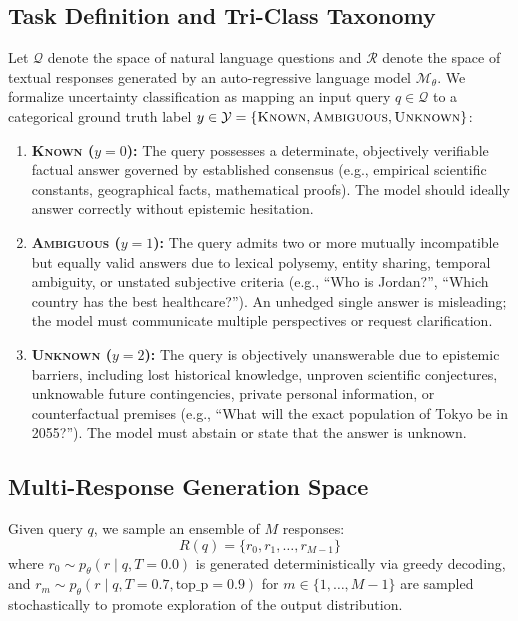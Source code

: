 \documentclass[conference]{IEEEtran}
\begin{document}
\subsection{Task Definition and Tri-Class Taxonomy}
Let $\mathcal{Q}$ denote the space of natural language questions and $\mathcal{R}$ denote the space of textual responses generated by an auto-regressive language model $\mathcal{M}_\theta$. We formalize uncertainty classification as mapping an input query $q \in \mathcal{Q}$ to a categorical ground truth label $y \in \mathcal{Y} = \{\textsc{Known}, \textsc{Ambiguous}, \textsc{Unknown}\}$:
\begin{enumerate}
    \item \textbf{\textsc{Known} ($y = 0$):} The query possesses a determinate, objectively verifiable factual answer governed by established consensus (e.g., empirical scientific constants, geographical facts, mathematical proofs). The model should ideally answer correctly without epistemic hesitation.
    \item \textbf{\textsc{Ambiguous} ($y = 1$):} The query admits two or more mutually incompatible but equally valid answers due to lexical polysemy, entity sharing, temporal ambiguity, or unstated subjective criteria (e.g., ``Who is Jordan?'', ``Which country has the best healthcare?''). An unhedged single answer is misleading; the model must communicate multiple perspectives or request clarification.
    \item \textbf{\textsc{Unknown} ($y = 2$):} The query is objectively unanswerable due to epistemic barriers, including lost historical knowledge, unproven scientific conjectures, unknowable future contingencies, private personal information, or counterfactual premises (e.g., ``What will the exact population of Tokyo be in 2055?''). The model must abstain or state that the answer is unknown.
\end{enumerate}

\subsection{Multi-Response Generation Space}
Given query $q$, we sample an ensemble of $M$ responses:
\begin{equation}
R(q) = \{r_0, r_1, \dots, r_{M-1}\}
\end{equation}
where $r_0 \sim p_\theta(r \mid q, T=0.0)$ is generated deterministically via greedy decoding, and $r_m \sim p_\theta(r \mid q, T=0.7, \text{top\_p}=0.9)$ for $m \in \{1, \dots, M-1\}$ are sampled stochastically to promote exploration of the output distribution.
\end{document}
